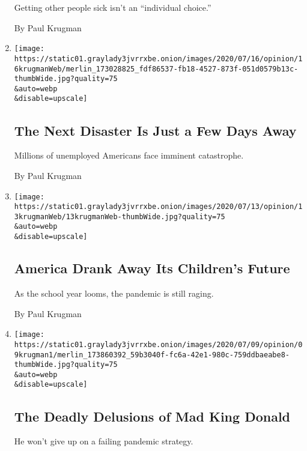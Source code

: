 \begin{enumerate}
  Getting other people sick isn't an ``individual choice.''

  By Paul Krugman
\item
  \href{/2020/07/16/opinion/coronavirus-economy-unemployment.html}{}

  \texttt{[image: https://static01.graylady3jvrrxbe.onion/images/2020/07/16/opinion/16krugmanWeb/merlin\_173028825\_fdf86537-fb18-4527-873f-051d0579b13c-thumbWide.jpg?quality=75\\\&auto=webp\\\&disable=upscale]}

  \hypertarget{the-next-disaster-is-just-a-few-days-away}{%
  \subsection{The Next Disaster Is Just a Few Days
  Away}\label{the-next-disaster-is-just-a-few-days-away}}

  Millions of unemployed Americans face imminent catastrophe.

  By Paul Krugman
\item
  \href{/2020/07/13/opinion/coronavirus-schools-bars.html}{}

  \texttt{[image: https://static01.graylady3jvrrxbe.onion/images/2020/07/13/opinion/13krugmanWeb/13krugmanWeb-thumbWide.jpg?quality=75\\\&auto=webp\\\&disable=upscale]}

  \hypertarget{america-drank-away-its-childrens-future}{%
  \subsection{America Drank Away Its Children's
  Future}\label{america-drank-away-its-childrens-future}}

  As the school year looms, the pandemic is still raging.

  By Paul Krugman
\item
  \href{/2020/07/09/opinion/trump-coronavirus.html}{}

  \texttt{[image: https://static01.graylady3jvrrxbe.onion/images/2020/07/09/opinion/09krugman1/merlin\_173860392\_59b3040f-fc6a-42e1-980c-759ddbaeabe8-thumbWide.jpg?quality=75\\\&auto=webp\\\&disable=upscale]}

  \hypertarget{the-deadly-delusions-of-mad-king-donald}{%
  \subsection{The Deadly Delusions of Mad King
  Donald}\label{the-deadly-delusions-of-mad-king-donald}}

  He won't give up on a failing pandemic strategy.


\end{enumerate}
